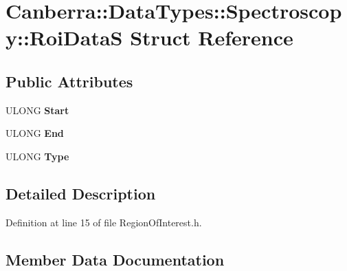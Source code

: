 \hypertarget{struct_canberra_1_1_data_types_1_1_spectroscopy_1_1_roi_data_s}{}\section{Canberra\+:\+:Data\+Types\+:\+:Spectroscopy\+:\+:Roi\+DataS Struct Reference}
\label{struct_canberra_1_1_data_types_1_1_spectroscopy_1_1_roi_data_s}
\subsection*{Public Attributes}
\begin{DoxyCompactItemize}
\item 
\mbox{\label{struct_canberra_1_1_data_types_1_1_spectroscopy_1_1_roi_data_s_a2d54d64ae10d634f6b76768c9d9ad3c9}} 
U\+L\+O\+NG {\bfseries Start}
\item 
\mbox{\label{struct_canberra_1_1_data_types_1_1_spectroscopy_1_1_roi_data_s_a6814b69aa695705bd040fd061062d47f}} 
U\+L\+O\+NG {\bfseries End}
\item 
\mbox{\label{struct_canberra_1_1_data_types_1_1_spectroscopy_1_1_roi_data_s_a4e5d3f5194205d37aebd490240ae1a1d}} 
U\+L\+O\+NG {\bfseries Type}
\end{DoxyCompactItemize}


\subsection{Detailed Description}


Definition at line 15 of file Region\+Of\+Interest.\+h.



\subsection{Member Data Documentation}
\mbox{\label{struct_canberra_1_1_data_types_1_1_spectroscopy_1_1_roi_data_s_a6814b69aa695705bd040fd061062d47f}} 
